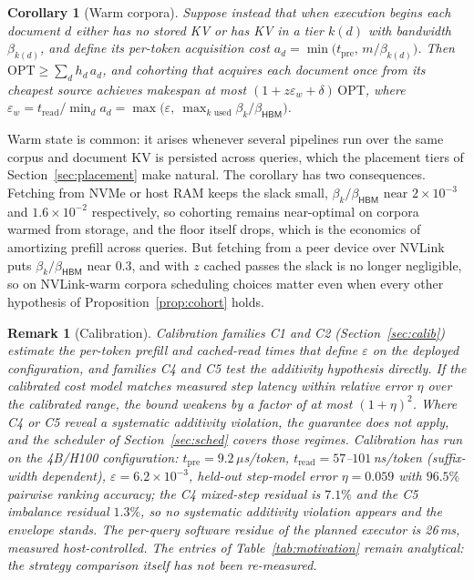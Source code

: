 \documentclass[10pt,twocolumn]{article}
\newtheorem{corollary}{Corollary}
\newtheorem{remark}{Remark}
\newcommand{\hbm}{\mathsf{HBM}}
\newcommand{\eps}{\varepsilon}
\begin{document}
\begin{corollary}[Warm corpora]
\label{cor:warm}
Suppose instead that when execution begins each document $d$ either has no stored KV or has KV in a tier $k(d)$ with bandwidth $\beta_{k(d)}$, and define its per-token acquisition cost $a_d = \min\!\big(t_{\mathrm{pre}},\, m/\beta_{k(d)}\big)$. Then $\mathrm{OPT} \ge \sum_d h_d\, a_d$, and cohorting that acquires each document once from its cheapest source achieves makespan at most $(1 + z\eps_w + \delta)\,\mathrm{OPT}$, where $\eps_w = t_{\mathrm{read}} / \min_d a_d = \max\big(\eps,\ \max_{k \text{ used}} \beta_k/\beta_{\hbm}\big)$.
\end{corollary}

Warm state is common: it arises whenever several pipelines run over the same corpus and document KV is persisted across queries, which the placement tiers of Section~\ref{sec:placement} make natural. The corollary has two consequences. Fetching from NVMe or host RAM keeps the slack small, $\beta_k/\beta_{\hbm}$ near $2\times 10^{-3}$ and $1.6\times 10^{-2}$ respectively, so cohorting remains near-optimal on corpora warmed from storage, and the floor itself drops, which is the economics of amortizing prefill across queries. But fetching from a peer device over NVLink puts $\beta_k/\beta_{\hbm}$ near $0.3$, and with $z$ cached passes the slack is no longer negligible, so on NVLink-warm corpora scheduling choices matter even when every other hypothesis of Proposition~\ref{prop:cohort} holds.

\begin{remark}[Calibration]
\label{rem:empirical}
Calibration families C1 and C2 (Section~\ref{sec:calib}) estimate the per-token prefill and cached-read times that define $\eps$ on the deployed configuration, and families C4 and C5 test the additivity hypothesis directly. If the calibrated cost model matches measured step latency within relative error $\eta$ over the calibrated range, the bound weakens by a factor of at most $(1+\eta)^2$. Where C4 or C5 reveal a systematic additivity violation, the guarantee does not apply, and the scheduler of Section~\ref{sec:sched} covers those regimes. Calibration has run on the 4B/H100 configuration: $t_{\mathrm{pre}} = 9.2\,\mu$s/token, $t_{\mathrm{read}} = 57$--$101$\,ns/token (suffix-width dependent), $\eps = 6.2\times10^{-3}$, held-out step-model error $\eta = 0.059$ with $96.5\%$ pairwise ranking accuracy; the C4 mixed-step residual is $7.1\%$ and the C5 imbalance residual $1.3\%$, so no systematic additivity violation appears and the envelope stands. The per-query software residue of the planned executor is 26\,ms, measured host-controlled. The entries of Table~\ref{tab:motivation} remain analytical: the strategy comparison itself has not been re-measured.
\end{remark}
\end{document}
